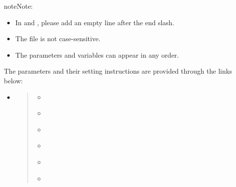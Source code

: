 \documentclass[letterpaper,10pt,english]{sphinxmanual}
\begin{document}
\begin{sphinxadmonition}{note}{Note:}\begin{itemize}
\item {} 
In  and , please add an empty line after the end slash.

\item {} 
The file is not case-sensitive.

\item {} 
The parameters and variables can appear in any order.

\end{itemize}
\end{sphinxadmonition}

The parameters and their setting instructions are provided through the links below:
\begin{itemize}
\item {} 
{\hyperref[\detokenize{input_files/RunControl/Model_run_options:model-run-options}]{}}
\begin{quote}
\begin{itemize}\setlength{\itemsep}{0pt}\setlength{\parskip}{0pt}
\item {} 
{\hyperref[\detokenize{input_files/RunControl/Model_run_options:cmdoption-arg-cbluse}]{}}

\item {} 
{\hyperref[\detokenize{input_files/RunControl/Model_run_options:cmdoption-arg-snowuse}]{}}

\item {} 
{\hyperref[\detokenize{input_files/RunControl/Model_run_options:cmdoption-arg-solweiguse}]{}}

\item {} 
{\hyperref[\detokenize{input_files/RunControl/Model_run_options:cmdoption-arg-netradiationmethod}]{}}

\item {} 
{\hyperref[\detokenize{input_files/RunControl/Model_run_options:cmdoption-arg-anthropheatmethod}]{}}

\item {} 
{\hyperref[\detokenize{input_files/RunControl/Model_run_options:cmdoption-arg-anthropco2method}]{}}


\end{itemize}
\end{quote}
\end{itemize}
\end{document}
